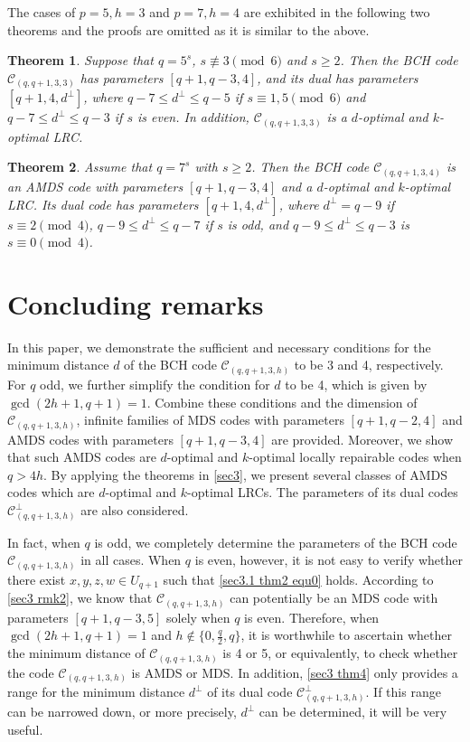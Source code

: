 \documentclass[10pt]{article}%
\newtheorem{theorem}{Theorem}%
\begin{document}
	The cases of $p=5,h=3$ and $p=7,h=4$ are exhibited in the following two theorems and the proofs are omitted as it is similar to the above.
	
	\begin{theorem}\label{sec4 thm5}
		Suppose that $q=5^s$, $s \not\equiv 3 \pmod 6$ and $s \ge 2$. Then the BCH code $\mathcal{C}_{(q,q+1,3,3)}$ has parameters $[q+1,q-3,4]$, and its dual has parameters $[q+1,4,d^{\perp}]$, where $q-7 \le d^\perp \le q-5$ if $s \equiv 1,5 \pmod 6$ and $q-7 \le d^\perp \le q-3$ if $s$ is even. In addition, $\mathcal{C}_{(q,q+1,3,3)}$ is a $d$-optimal and $k$-optimal LRC.
	\end{theorem}
	
	\begin{theorem}
		\label{sec4 thm6}
		Assume that $q=7^s$ with $s \ge 2$. Then the BCH code $\mathcal{C}_{(q,q+1,3,4)}$ is an AMDS code with parameters $[q+1,q-3,4]$ and a $d$-optimal and $k$-optimal LRC. Its dual code has parameters $[q+1,4,d^{\perp}]$, where $d^{\perp}=q-9$ if $s\equiv2\pmod4$, $q-9 \le d^\perp \le q-7$ if $s$ is odd, and $q-9 \le d^\perp \le q-3$ is $s\equiv0\pmod4$.
	\end{theorem}
	
	\section{Concluding remarks}\label{sec5}
	
	In this paper, we demonstrate the sufficient and necessary conditions for the minimum distance $d$ of the BCH code $\mathcal{C}_{(q,q+1,3,h)}$ to be 3 and 4, respectively. For $q$ odd, we further simplify the condition for $d$ to be 4, which is given by $\gcd(2h+1, q+1) = 1$. Combine these conditions and the dimension of $\mathcal{C}_{(q,q+1,3,h)}$, infinite families of MDS codes with parameters $[q+1,q-2,4]$ and AMDS codes with parameters $[q+1,q-3,4]$ are provided. Moreover, we show that such AMDS codes are  $d$-optimal and $k$-optimal locally repairable codes when $q>4h$. By applying the theorems in \cref{sec3}, we present several classes of AMDS codes which are $d$-optimal and $k$-optimal LRCs. The parameters of its dual codes $\mathcal{C}_{(q,q+1,3,h)}^\perp$ are also considered.
	
	In fact, when $q$ is odd, we completely determine the parameters of the BCH code $\mathcal{C}_{(q,q+1,3,h)}$ in all cases. When $q$ is even, however, it is not easy to verify whether there exist $x, y, z, w\in U_{q+1}$ such that \cref{sec3.1 thm2 equ0} holds. According to \cref{sec3 rmk2}, we know that $\mathcal{C}_{(q,q+1,3,h)}$ can potentially be an MDS code with parameters $[q+1,q-3,5]$ solely when $q$ is even. Therefore, when $\gcd(2h+1, q+1)=1$ and $h\notin\{0,\frac{q}{2},q\}$, it is worthwhile to ascertain whether the minimum distance of $\mathcal{C}_{(q,q+1,3,h)}$ is 4 or 5, or equivalently, to check whether the code $\mathcal{C}_{(q,q+1,3,h)}$ is AMDS or MDS. In addition, \cref{sec3 thm4} only provides a range for the minimum distance $d^\perp$ of its dual code $\mathcal{C}_{(q,q+1,3,h)}^\perp$. If this range can be narrowed down, or more precisely, $d^\perp$ can be determined, it will be very useful.
	
\end{document}
